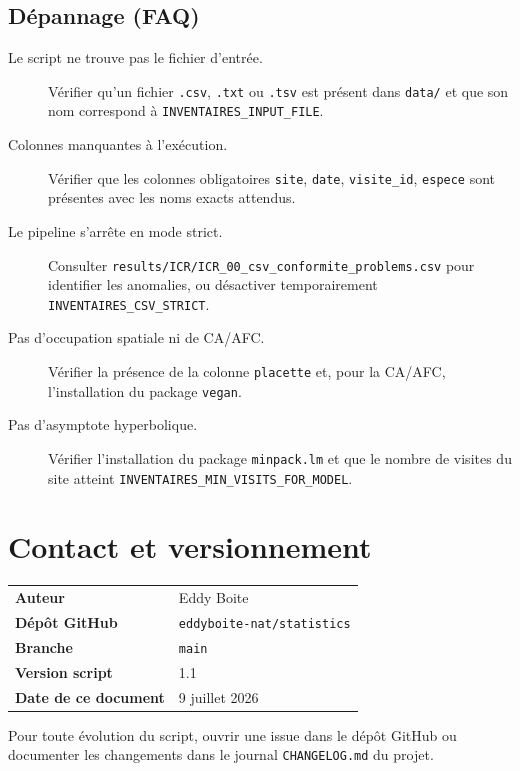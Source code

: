 \documentclass[11pt,a4paper]{article}
\begin{document}
\subsection{Dépannage (FAQ)}
\begin{description}
  \item[Le script ne trouve pas le fichier d'entrée.]
    Vérifier qu'un fichier \texttt{.csv}, \texttt{.txt} ou \texttt{.tsv} est présent dans \texttt{data/}
    et que son nom correspond à \texttt{INVENTAIRES\_INPUT\_FILE}.

  \item[Colonnes manquantes à l'exécution.]
    Vérifier que les colonnes obligatoires \texttt{site}, \texttt{date}, \texttt{visite\_id},
    \texttt{espece} sont présentes avec les noms exacts attendus.

  \item[Le pipeline s'arrête en mode strict.]
    Consulter \texttt{results/ICR/ICR\_00\_csv\_conformite\_problems.csv} pour identifier les
    anomalies, ou désactiver temporairement \texttt{INVENTAIRES\_CSV\_STRICT}.

  \item[Pas d'occupation spatiale ni de CA/AFC.]
    Vérifier la présence de la colonne \texttt{placette} et, pour la CA/AFC, l'installation du
    package \texttt{vegan}.

  \item[Pas d'asymptote hyperbolique.]
    Vérifier l'installation du package \texttt{minpack.lm} et que le nombre de visites du site
    atteint \texttt{INVENTAIRES\_MIN\_VISITS\_FOR\_MODEL}.
\end{description}

\section*{Contact et versionnement}

\begin{table}[htbp]
  \centering
  \begin{tabular}{ll}
    \toprule
    \textbf{Auteur}          & Eddy Boite \\
    \textbf{Dépôt GitHub}    & \texttt{eddyboite-nat/statistics} \\
    \textbf{Branche}         & \texttt{main} \\
    \textbf{Version script}  & 1.1 \\
    \textbf{Date de ce document} & 9 juillet 2026 \\
    \bottomrule
  \end{tabular}
\end{table}

Pour toute évolution du script, ouvrir une issue dans le dépôt GitHub
ou documenter les changements dans le journal \texttt{CHANGELOG.md} du projet.

\end{document}
